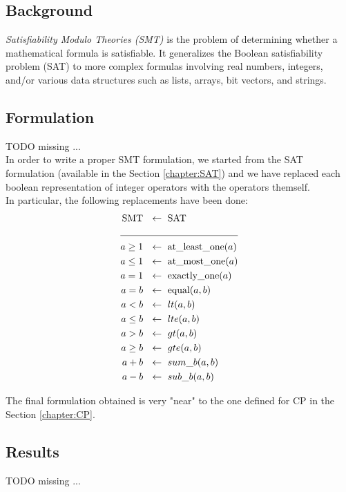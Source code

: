 
\subsection{Background}
    \textit{Satisfiability Modulo Theories (SMT)} is the problem of determining whether a
    mathematical formula is satisfiable. It generalizes the Boolean satisfiability problem (SAT) to
    more complex formulas involving real numbers, integers, and/or various data structures such as 
    lists, arrays, bit vectors, and strings.


\subsection{Formulation}
    \colorbox{BurntOrange}{TODO missing ...} \\

    In order to write a proper SMT formulation, we started from the SAT formulation (available in
    the Section \ref{chapter:SAT}) and we have replaced each boolean representation of integer 
    operators with the operators themself.\\

    In particular, the following replacements have been done:
    \begin{align*}
      \text{SMT} \ &\ \leftarrow\ \text{SAT}      \\
                 \cline{1-2}
        a \geq 1 \ &\ \leftarrow\ \text{at\_least\_one}(a) \\
        a \leq 1 \ &\ \leftarrow\ \text{at\_most\_one}(a)  \\
           a = 1 \ &\ \leftarrow\ \text{exactly\_one}(a)   \\
           a = b \ &\ \leftarrow\ \text{equal}(a,b)        \\
           a < b \ &\ \leftarrow\ lt(a,b)                  \\
        a \leq b \ &\ \leftarrow\ lte(a,b)                 \\
           a > b \ &\ \leftarrow\ gt(a,b)                  \\
        a \geq b \ &\ \leftarrow\ gte(a,b)                 \\
           a + b \ &\ \leftarrow\ sum\_b(a,b)              \\   
           a - b \ &\ \leftarrow\ sub\_b(a,b)                 
    \end{align*}

    The final formulation obtained is very "near" to the one defined for CP in the
    Section \ref{chapter:CP}.


\subsection{Results}
    \colorbox{BurntOrange}{TODO missing ...} \\
